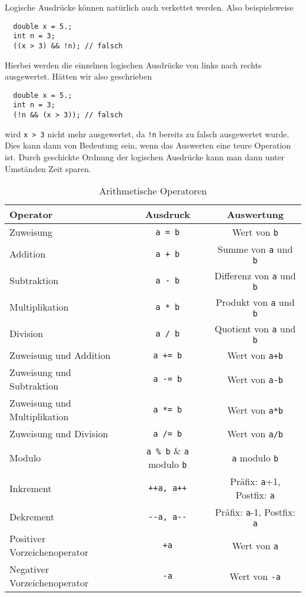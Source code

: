 Logische Ausdrücke können natürlich auch verkettet werden. 
Also beispielsweise
\begin{lstlisting}
  double x = 5.;
  int n = 3;
  ((x > 3) && !n); // falsch
\end{lstlisting}
Hierbei werden die einzelnen logischen Ausdrücke von links nach rechts ausgewertet. 
Hätten wir also geschrieben
\begin{lstlisting}
  double x = 5.;
  int n = 3;
  (!n && (x > 3)); // falsch
\end{lstlisting}
wird \verb|x > 3| nicht mehr ausgewertet, da \verb|!n| bereits zu falsch ausgewertet wurde.
Dies kann dann von Bedeutung sein, wenn das Auswerten eine teure Operation ist.
Durch geschickte Ordnung der logischen Ausdrücke kann man dann unter Umständen Zeit sparen.


\begin{table}
  \centering
  \begin{tabular}{l c c}
    \hline
    Operator & Ausdruck & Auswertung \\
    \hline
    Zuweisung & \verb|a = b| & Wert von \verb|b| \\
    Addition & \verb|a + b| & Summe von \verb|a| und \verb|b| \\
    Subtraktion & \verb|a - b| & Differenz von \verb|a| und \verb|b| \\
    Multiplikation & \verb|a * b| & Produkt von \verb|a| und \verb|b| \\
    Division & \verb|a / b| & Quotient von \verb|a| und \verb|b| \\
    Zuweisung und Addition & \verb|a += b| & Wert von \verb|a+b| \\
    Zuweisung und Subtraktion & \verb|a -= b| & Wert von \verb|a-b| \\
    Zuweisung und Multiplikation & \verb|a *= b| & Wert von \verb|a*b| \\
    Zuweisung und Division & \verb|a /= b| & Wert von \verb|a/b| \\
    Modulo & \verb|a % b| & \verb|a| modulo \verb|b| \\
    Inkrement & \verb|++a, a++| & Präfix: \verb|a|+1, Postfix: \verb|a| \\
    Dekrement & \verb|--a, a--| & Präfix: \verb|a|-1, Postfix: \verb|a| \\
    Positiver Vorzeichenoperator & \verb|+a| & Wert von \verb|a| \\
    Negativer Vorzeichenoperator & \verb|-a| & Wert von \verb|-a|  \\
    \hline
  \end{tabular}
  \caption{Arithmetische Operatoren \label{oper}}
\end{table}

